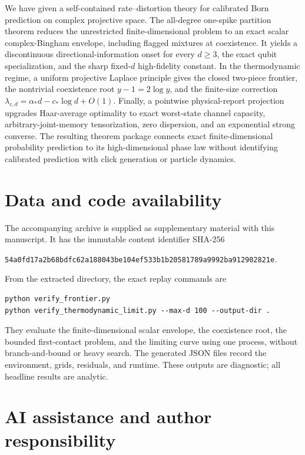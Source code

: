 \documentclass[11pt,a4paper]{article}
\theoremstyle{remark}
\begin{document}
We have given a self-contained rate--distortion theory for calibrated Born
prediction on complex projective space.  The all-degree one-spike partition
theorem reduces the unrestricted finite-dimensional problem to an exact
scalar complex-Bingham envelope, including flagged mixtures at coexistence.
It yields a discontinuous directional-information onset for every $d\ge3$,
the exact qubit specialization, and the sharp fixed-$d$ high-fidelity
constant.  In the thermodynamic regime, a uniform projective Laplace principle
gives the closed two-piece frontier, the nontrivial coexistence root
$y-1=2\log y$, and the finite-size correction
$\lambda_{c,d}=\alpha_*d-c_*\log d+O(1)$.  Finally, a pointwise
physical-report projection upgrades Haar-average optimality to exact
worst-state channel capacity, arbitrary-joint-memory tensorization, zero
dispersion, and an exponential strong converse.  The resulting theorem
package connects exact finite-dimensional probability prediction to its
high-dimensional phase law without identifying calibrated prediction with
click generation or particle dynamics.

\section*{Data and code availability}

The accompanying archive  is supplied as supplementary
material with this manuscript.  It has the immutable content identifier
SHA-256
\begin{center}
\footnotesize
\texttt{54a0fd17a2b68bdfc62a188043be104ef533b1b20581789a9992ba912902821e}.
\end{center}
From the extracted directory, the exact replay commands are
\begin{verbatim}
python verify_frontier.py
python verify_thermodynamic_limit.py --max-d 100 --output-dir .
\end{verbatim}
They evaluate the finite-dimensional scalar envelope, the coexistence root,
the bounded first-contact problem, and the limiting curve using one process,
without branch-and-bound or heavy search.  The generated JSON files record
the environment, grids, residuals, and runtime.  These outputs are diagnostic;
all headline results are analytic.

\section*{AI assistance and author responsibility}
\end{document}
